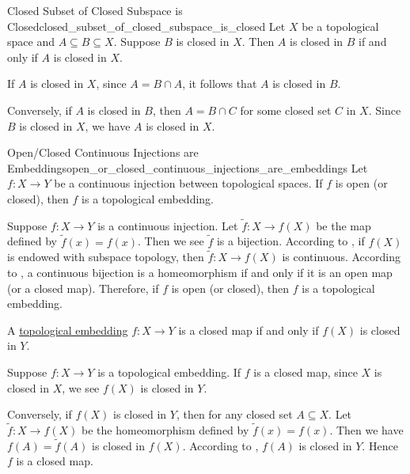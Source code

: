 \documentclass{report}
\begin{document}
\begin{proposition}{Closed Subset of Closed Subspace is Closed}{closed_subset_of_closed_subspace_is_closed}
	Let $X$ be a topological space and $A\subseteq B\subseteq X$. Suppose $B$ is closed in $X$. Then $A$ is closed in $B$ if and only if $A$ is closed in $X$.
\end{proposition}
\begin{prf}
	If $A$ is closed in $X$, since $A=B \cap A$, it follows that $A$ is closed in $B$.
	
	Conversely, if $A$ is closed in $B$, then $A=B\cap C$ for some closed set $C$ in $X$. Since $B$ is closed in $X$, we have $A$ is closed in $X$.
\end{prf}

\begin{proposition}{Open/Closed Continuous Injections are Embeddings}{open_or_closed_continuous_injections_are_embeddings}
	Let $f:X\to Y$ be a continuous injection between topological spaces. If $f$ is open (or closed), then $f$ is a topological embedding.
\end{proposition}
\begin{prf}
	Suppose $f:X\to Y$ is a continuous injection. Let $\tilde{f}:X\to f(X)$ be the map defined by $\tilde{f}(x)=f(x)$. Then we see $\tilde{f}$ is a bijection. According to , if $f(X)$ is endowed with subspace topology, then $\tilde{f}:X\to f(X)$ is continuous. According to , a continuous bijection is a homeomorphism if and only if it is an open map (or a closed map). Therefore, if $f$ is open (or closed), then $f$ is a topological embedding.
\end{prf}

\begin{proposition}{}{}
	A \hyperref[topological_embedding]{topological embedding} $f:X\to Y$ is a closed map if and only if $f(X)$ is closed in $Y$.
\end{proposition}
\begin{prf}
	Suppose $f:X\to Y$ is a topological embedding. If $f$ is a closed map, since $X$ is closed in $X$, we see $f(X)$ is closed in $Y$.

	Conversely, if $f(X)$ is closed in $Y$, then for any closed set $A\subseteq X$. Let $\tilde{f}:X\to f(X)$ be the homeomorphism defined by $\tilde{f}(x)=f(x)$. Then we have $f(A)=\tilde{f}(A)$ is closed in $f(X)$. According to , $f(A)$ is closed in $Y$. Hence $f$ is a closed map.
\end{prf}
\end{document}
